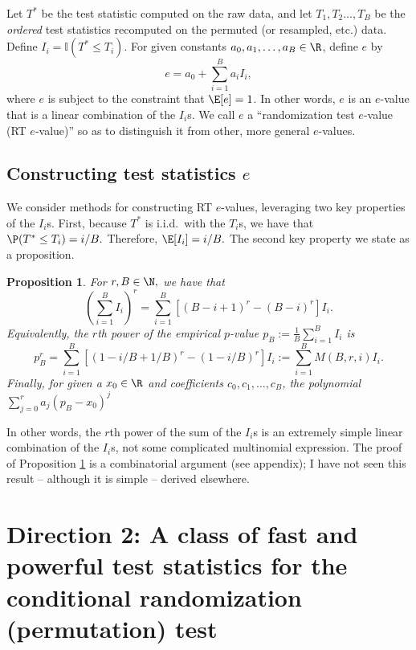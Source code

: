 \documentclass[12pt]{article}
\newtheorem{proposition}{Proposition}
\begin{document}
Let $T^*$ be the test statistic computed on the raw data, and let $T_1, T_2 \dots, T_B$ be the \textit{ordered} test statistics recomputed on the permuted (or resampled, etc.) data. Define $I_i = \mathbb{I}(T^* \leq T_i).$ For given constants $a_0, a_1, \dots, a_B \in \R$, define $e$ by 
$$e = a_0 + \sum_{i=1}^B a_i I_i,$$ where $e$ is subject to the constraint that $\E[e] = 1$. In other words, $e$ is an $e$-value that is a linear combination of the $I_i$s. We call $e$ a ``randomization test $e$-value (RT $e$-value)'' so as to distinguish it from other, more general $e$-values.

\subsection*{Constructing test statistics $e$}

We consider methods for constructing RT $e$-values, leveraging two key properties of the $I_i$s. First, because $T^*$ is i.i.d.\ with the $T_i$s, we have that $\P(T^* \leq T_i) = i/B.$ Therefore, $\E[I_i] = i/B.$ The second key property we state as a proposition.
\begin{proposition}\label{thm:power_of_is}
For $r,B \in \N,$ we have that
$$ \left(\sum_{i=1}^B I_i\right)^r = \sum_{i=1}^B \left[ (B - i + 1)^r - (B - i)^r \right] I_i.$$ Equivalently, the $r$th power of the empirical $p$-value $p_B := \frac{1}{B} \sum_{i=1}^B  I_i $ is $$ p_B^r = \sum_{i=1}^B \left[ (1 - i/B + 1/B)^r - (1 - i/B)^r \right]I_i := \sum_{i=1}^B M(B,r,i) I_i.$$ Finally, for given a $x_0 \in \R$ and coefficients $c_0, c_1, \dots, c_B$, the polynomial $ \sum_{j=0}^r a_j(p_B - x_0)^j $

\end{proposition}
In other words, the $r$th power of the sum of the $I_i$s is an extremely simple linear combination of the $I_i$s, not some complicated multinomial expression. The proof of Proposition \ref{thm:power_of_is} is a combinatorial argument (see appendix); I have not seen this result -- although it is simple -- derived elsewhere.


\section*{Direction 2: A class of fast and powerful test statistics for the conditional randomization (permutation) test}

\section*{}

\printbibliography
\end{document}
